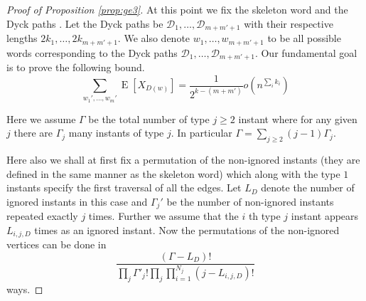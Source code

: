 \documentclass[12pt]{article}
\numberwithin{equation}{section}
\numberwithin{equation}{section}
\theoremstyle{definition}
\DeclareMathOperator{\E}{E} \DeclareMathOperator{\var}{Var}
\renewcommand{\1}{\bf 1}
\begin{document}
\begin{proof}[Proof of Proposition \ref{prop:ge3}]
At this point we fix the skeleton word and the Dyck paths . Let the Dyck paths be $\mathcal{D}_{1},\ldots, \mathcal{D}_{m+m'+1}$ with their respective lengths $2k_{1},\ldots, 2k_{m+m'+1}$. We also denote $w_{1},\ldots, w_{m+m'+1}$ to be all possible words corresponding to the Dyck paths $\mathcal{D}_{1},\ldots , \mathcal{D}_{m+m'+1}$.
Our fundamental goal is to prove the following bound.
\begin{equation}
\sum_{w_{1}',\ldots, w_{m}'} \E\left[ X_{D(w)} \right]= \frac{1}{2^{
k-(m+m')}}o\left( n^{\sum_{i}k_{i}} \right)
\end{equation} 

Here we assume $\Gamma$ be the total number of type $j\ge 2$ instant where for any given $j$ there are $\Gamma_{j}$ many instants of type $j$. In particular $\Gamma = \sum_{j\ge 2} (j-1)\Gamma_{j}$. 

Here also we shall at first fix a permutation of the non-ignored instants (they are defined in the same manner as the skeleton word) which along with the type $1$ instants specify the first traversal of all the edges. Let $L_{D}$ denote the number of ignored instants in this case and $\Gamma_{j}'$  be the number of non-ignored instants repeated exactly $j$ times. Further we assume that the $i$ th type $j$ instant appears $L_{i,j,D}$ times as an ignored instant. Now the permutations of the non-ignored vertices can be done in 
\begin{equation}\label{eq:permdyck}
\frac{(\Gamma-L_{D})!}{\prod_{j} \Gamma'_{j}! \prod_{j}\prod_{i=1}^{N_{j}}(j-L_{i,j,D})!}
\end{equation}
 ways.    


\end{proof}
\end{document}
